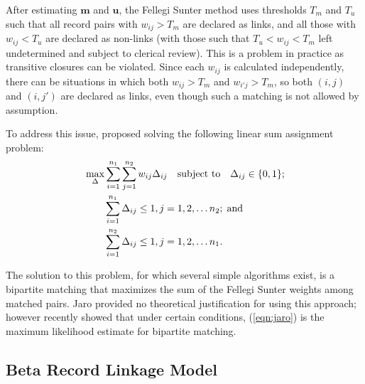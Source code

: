 \documentclass[ba]{imsart}
\begin{document}

After estimating $\bm{m}$ and $\bm{u}$, the Fellegi Sunter method uses thresholds $T_m$ and $T_u$ such that all record pairs with $w_{ij} > T_m$ are declared as links, and all those with $w_{ij} < T_u$ are declared as non-links (with those such that $T_u < w_{ij} < T_m$ left undetermined and subject to clerical review). This is a problem in practice as transitive closures can be violated. Since each $w_{ij}$ is calculated independently, there can be situations in which both $w_{ij} > T_m$ and $w_{i'j} > T_m$, so both $(i,j)$ and $(i, j')$ are declared as links, even though such a matching is not allowed by assumption. 

To address this issue, \cite{jaro1989} proposed solving the following linear sum assignment problem:
\begin{align}
	\label{eqn:jaro}
	&\max_{\Delta} \sum_{i=1}^{n_1} \sum_{j=1}^{n_2} w_{ij} \Delta_{ij} 
	\quad \text{subject to} \quad \Delta_{ij} \in \{0,1\}; \\
	& \quad \quad \sum_{i=1}^{n_1}  \Delta_{ij}  \leq 1, j=1,2, \ldots n_2; \; \text{and} \notag\\
	& \quad \quad\sum_{i=1}^{n_2}  \Delta_{ij}  \leq 1, j=1,2, \ldots n_1. \notag
\end{align}

The solution to this problem, for which several simple algorithms exist, is a bipartite matching that maximizes the sum of the Fellegi Sunter weights among matched pairs. Jaro provided no theoretical justification for using this approach; however \cite{sadinle_bayesian_2017} recently showed that under certain conditions, (\ref{eqn:jaro}) is the maximum likelihood estimate for bipartite matching. 

\subsection{Beta Record Linkage Model}
\label{BRL}
\end{document}
